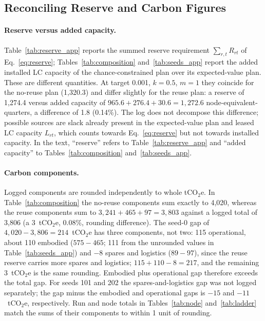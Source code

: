 \documentclass{article} %
\begin{document}
\subsection{Reconciling Reserve and Carbon Figures}
\label{app:reconcile}
\paragraph{Reserve versus added capacity.} Table~\ref{tab:reserve_app} reports the summed reserve requirement $\sum_{r,t}R_{rt}$ of Eq.~\ref{eq:reserve}; Tables~\ref{tab:composition} and~\ref{tab:seeds_app} report the added installed LC capacity of the chance-constrained plan over its expected-value plan. These are different quantities. At target 0.001, $k=0.5$, $m=1$ they coincide for the no-reuse plan (1,320.3) and differ slightly for the reuse plan: a reserve of 1,274.4 versus added capacity of $965.6 + 276.4 + 30.6 = 1{,}272.6$ node-equivalent-quarters, a difference of 1.8 (0.14\%). The log does not decompose this difference; possible sources are slack already present in the expected-value plan and leased LC capacity $L_{rt}$, which counts towards Eq.~\ref{eq:reserve} but not towards installed capacity. In the text, ``reserve'' refers to Table~\ref{tab:reserve_app} and ``added capacity'' to Tables~\ref{tab:composition} and~\ref{tab:seeds_app}.

\paragraph{Carbon components.} Logged components are rounded independently to whole tCO$_2$e. In Table~\ref{tab:composition} the no-reuse components sum exactly to 4,020, whereas the reuse components sum to $3{,}241 + 465 + 97 = 3{,}803$ against a logged total of 3,806 (a 3~tCO$_2$e, 0.08\%, rounding difference). The seed-0 gap of $4{,}020 - 3{,}806 = 214$~tCO$_2$e has three components, not two: 115 operational, about 110 embodied ($575 - 465$; 111 from the unrounded values in Table~\ref{tab:seeds_app}) and $-8$ spares and logistics ($89 - 97$), since the reuse reserve carries more spares and logistics; $115 + 110 - 8 = 217$, and the remaining 3~tCO$_2$e is the same rounding. Embodied plus operational gap therefore exceeds the total gap. For seeds 101 and 202 the spares-and-logistics gap was not logged separately; the gap minus the embodied and operational gaps is $-15$ and $-11$~tCO$_2$e, respectively. Run and node totals in Tables~\ref{tab:node} and~\ref{tab:ladder} match the sums of their components to within 1 unit of rounding.
\end{document}
